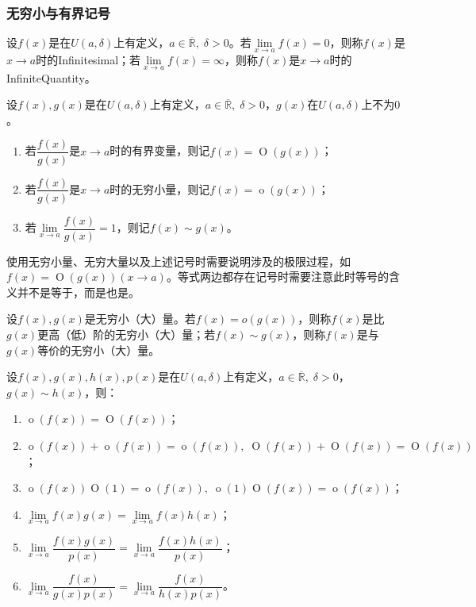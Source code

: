\subsubsection{无穷小与有界记号}
\begin{definition}
	设$f(x)$是在$U(a,\delta)$上有定义，$a\in\overline{\mathbb{R}},\;\delta>0$。若$\lim\limits_{x\to a}f(x)=0$，则称$f(x)$是$x\to a$时的\gls{Infinitesimal}；若$\lim\limits_{x\to a}f(x)=\infty$，则称$f(x)$是$x\to a$时的\gls{InfiniteQuantity}。
\end{definition}
\begin{definition}
	设$f(x),g(x)$是在$U(a,\delta)$上有定义，$a\in\overline{\mathbb{R}},\;\delta>0$，$g(x)$在$U(a,\delta)$上不为$0$。
	\begin{enumerate}
		\item 若$\dfrac{f(x)}{g(x)}$是$x\to a$时的有界变量，则记$f(x)=\operatorname{O}(g(x))$；
		\item 若$\dfrac{f(x)}{g(x)}$是$x\to a$时的无穷小量，则记$f(x)=\operatorname{o}(g(x))$；
		\item 若$\lim\limits_{x\to a}\dfrac{f(x)}{g(x)}=1$，则记$f(x)\sim g(x)$。
	\end{enumerate}
\end{definition}
\begin{note}
	使用无穷小量、无穷大量以及上述记号时需要说明涉及的极限过程，如$f(x)=\operatorname{O}(g(x))(x\to a)$。等式两边都存在记号时需要注意此时等号的含义并不是等于，而是也是。
\end{note}
\begin{definition}
	设$f(x),g(x)$是无穷小（大）量。若$f(x)=o(g(x))$，则称$f(x)$是比$g(x)$更高（低）阶的无穷小（大）量；若$f(x)\sim g(x)$，则称$f(x)$是与$g(x)$等价的无穷小（大）量。
\end{definition}
\begin{property}\label{prop:Oo}
	设$f(x),g(x),h(x),p(x)$是在$U(a,\delta)$上有定义，$a\in\overline{\mathbb{R}},\;\delta>0$，$g(x)\sim h(x)$，则：
	\begin{enumerate}
		\item $\operatorname{o}(f(x))=\operatorname{O}(f(x))$；
		\item $\operatorname{o}(f(x))+\operatorname{o}(f(x))=\operatorname{o}(f(x)),\;\operatorname{O}(f(x))+\operatorname{O}(f(x))=\operatorname{O}(f(x))$；
		\item $\operatorname{o}(f(x))\operatorname{O}(1)=\operatorname{o}(f(x)),\;\operatorname{o}(1)\operatorname{O}(f(x))=\operatorname{o}(f(x))$；
		\item $\lim\limits_{x\to a}f(x)g(x)=\lim\limits_{x\to a}f(x)h(x)$；
		\item $\lim\limits_{x\to a}\dfrac{f(x)g(x)}{p(x)}=\lim\limits_{x\to a}\dfrac{f(x)h(x)}{p(x)}$；
		\item $\lim\limits_{x\to a}\dfrac{f(x)}{g(x)p(x)}=\lim\limits_{x\to a}\dfrac{f(x)}{h(x)p(x)}$。
	\end{enumerate}
\end{property}
